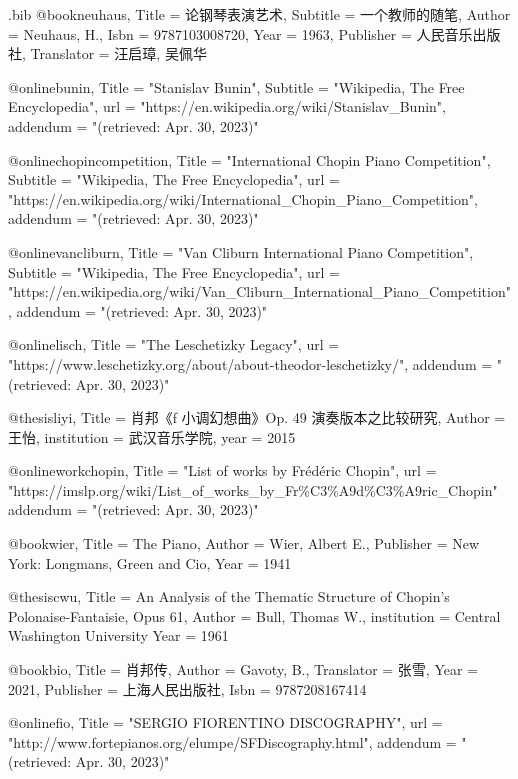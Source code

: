 \RequirePackage{filecontents}
\begin{filecontents*}{\jobname.bib}
@book{neuhaus,
    Title = {论钢琴表演艺术},
    Subtitle = {一个教师的随笔},
    Author = {Neuhaus, H.},
    Isbn = {9787103008720},
    Year = {1963},
    Publisher = {人民音乐出版社},
    Translator = {汪启璋, 吴佩华}
}

@online{bunin,
    Title = "Stanislav Bunin",
    Subtitle = "Wikipedia, The Free Encyclopedia",
    url = "https://en.wikipedia.org/wiki/Stanislav_Bunin",
    addendum = "(retrieved: Apr. 30, 2023)"
}

@online{chopincompetition,
    Title = "International Chopin Piano Competition",
    Subtitle = "Wikipedia, The Free Encyclopedia",
    url = "https://en.wikipedia.org/wiki/International_Chopin_Piano_Competition",
    addendum = "(retrieved: Apr. 30, 2023)"
}

@online{vancliburn,
    Title = "Van Cliburn International Piano Competition",
    Subtitle = "Wikipedia, The Free Encyclopedia",
    url = "https://en.wikipedia.org/wiki/Van_Cliburn_International_Piano_Competition",
    addendum = "(retrieved: Apr. 30, 2023)"
}

@online{lisch,
    Title = "The Leschetizky Legacy",
    url = "https://www.leschetizky.org/about/about-theodor-leschetizky/",
    addendum = "(retrieved: Apr. 30, 2023)"
}

@thesis{liyi,
    Title = {肖邦《f 小调幻想曲》Op. 49 演奏版本之比较研究},
    Author = {王怡},
    institution = {武汉音乐学院},
    year = {2015}
}

@online{workchopin,
    Title = "List of works by Frédéric Chopin",
    url = "https://imslp.org/wiki/List_of_works_by_Fr\%C3\%A9d\%C3\%A9ric_Chopin"
    addendum = "(retrieved: Apr. 30, 2023)"
}

@book{wier,
    Title = {The Piano},
    Author = {Wier, Albert E.},
    Publisher = {New York: Longmans, Green and Cio},
    Year = {1941}
}

@thesis{cwu,
    Title = {An Analysis of the Thematic Structure of Chopin’s Polonaise-Fantaisie, Opus 61},
    Author = {Bull, Thomas W.},
    institution = {Central Washington University}
    Year = {1961}
}

@book{bio,
    Title = {肖邦传},
    Author = {Gavoty, B.},
    Translator = {张雪},
    Year = {2021},
    Publisher = {上海人民出版社},
    Isbn = {9787208167414}
}

@online{fio,
    Title = "SERGIO FIORENTINO DISCOGRAPHY",
    url = "http://www.fortepianos.org/elumpe/SFDiscography.html",
    addendum = "(retrieved: Apr. 30, 2023)"
}


\end{filecontents*}
